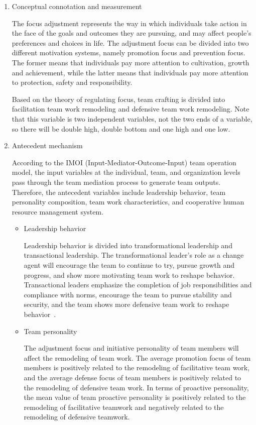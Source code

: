 \documentclass{mcmthesis}
\begin{document}
	\begin{enumerate}
		\item Conceptual connotation and measurement
		
		\qquad The focus adjustment represents the way in which individuals take action in the face of the goals and outcomes they are pursuing, and may affect people's preferences and choices in life.  The adjustment focus can be divided into two different motivation systems, namely promotion focus and prevention focus.  The former means that individuals pay more attention to cultivation, growth and achievement, while the latter means that individuals pay more attention to protection, safety and responsibility.

		\qquad Based on the theory of regulating focus, team crafting is divided into facilitation team work remodeling and defensive team work remodeling.  Note that this variable is two independent variables, not the two ends of a variable, so there will be double high, double bottom and one high and one low.

		\item Antecedent mechanism
		
		\qquad According to the IMOI (Input-Mediator-Outcome-Input) team operation model, the input variables at the individual, team, and organization levels pass through the team mediation process to generate team outputs.  Therefore, the antecedent variables include leadership behavior, team personality composition, team work characteristics, and cooperative human resource management system.

		\begin{itemize}
		\item Leadership behavior
		
		\qquad Leadership behavior is divided into transformational leadership and transactional leadership.  The transformational leader's role as a change agent will encourage the team to continue to try, pursue growth and progress, and show more motivating team work to reshape behavior.  Transactional leaders emphasize the completion of job responsibilities and compliance with norms, encourage the team to pursue stability and security, and the team shows more defensive team work to reshape behavior~\cite{4}.

		\item Team personality
		
		\qquad The adjustment focus and initiative personality of team members will affect the remodeling of team work.  The average promotion focus of team members is positively related to the remodeling of facilitative team work, and the average defense focus of team members is positively related to the remodeling of defensive team work.  In terms of proactive personality, the mean value of team proactive personality is positively related to the remodeling of facilitative teamwork and negatively related to the remodeling of defensive teamwork.


\end{itemize}
\end{enumerate}
\end{document}
